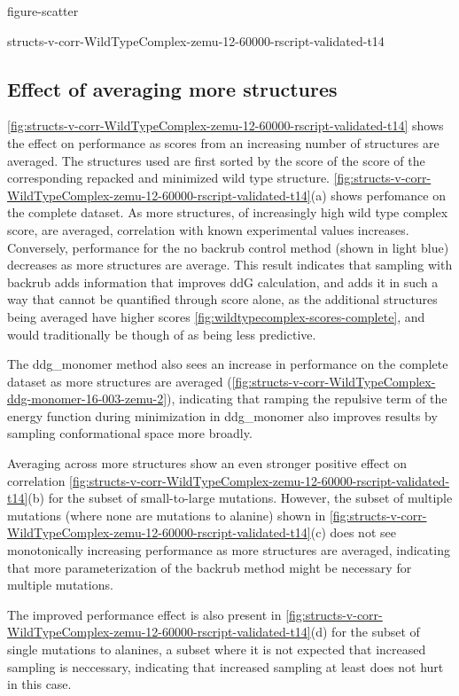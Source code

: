 {figure-scatter}

{structs-v-corr-WildTypeComplex-zemu-12-60000-rscript-validated-t14}

\subsection{Effect of averaging more structures}

\cref{fig:structs-v-corr-WildTypeComplex-zemu-12-60000-rscript-validated-t14} shows the effect on performance as scores from an increasing number of structures are averaged.
The structures used are first sorted by the score of the score of the corresponding repacked and minimized wild type structure.
\cref{fig:structs-v-corr-WildTypeComplex-zemu-12-60000-rscript-validated-t14}(a) shows perfomance on the complete dataset.
As more structures, of increasingly high wild type complex score, are averaged, correlation with known experimental values increases.
Conversely, performance for the no backrub control method (shown in light blue) decreases as more structures are average.
This result indicates that sampling with backrub adds information that improves ddG calculation, and adds it in such a way that cannot be quantified through score alone, as the additional structures being averaged have higher scores \cref{fig:wildtypecomplex-scores-complete}, and would traditionally be though of as being less predictive.

The ddg\_monomer method also sees an increase in performance on the complete dataset as more structures are averaged (\cref{fig:structs-v-corr-WildTypeComplex-ddg-monomer-16-003-zemu-2}), indicating that ramping the repulsive term of the energy function during minimization in ddg\_monomer also improves results by sampling conformational space more broadly.

Averaging across more structures show an even stronger positive effect on correlation \cref{fig:structs-v-corr-WildTypeComplex-zemu-12-60000-rscript-validated-t14}(b) for the subset of small-to-large mutations.
However, the subset of multiple mutations (where none are mutations to alanine) shown in \cref{fig:structs-v-corr-WildTypeComplex-zemu-12-60000-rscript-validated-t14}(c) does not see monotonically increasing performance as more structures are averaged, indicating that more parameterization of the backrub method might be necessary for multiple mutations.

The improved performance effect is also present in \cref{fig:structs-v-corr-WildTypeComplex-zemu-12-60000-rscript-validated-t14}(d) for the subset of single mutations to alanines, a subset where it is not expected that increased sampling is neccessary, indicating that increased sampling at least does not hurt in this case.

